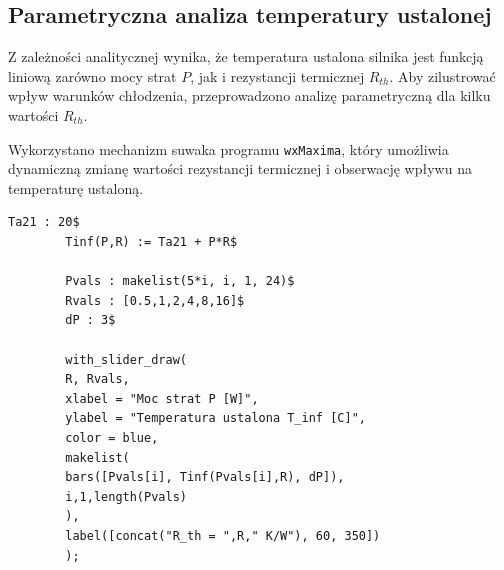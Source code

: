 \documentclass[a4paper,12pt]{article}
\begin{document}
	
	
	
	
	
	
	\subsection{Parametryczna analiza temperatury ustalonej}
	
	Z zależności analitycznej wynika, że temperatura ustalona silnika
	jest funkcją liniową zarówno mocy strat $P$, jak i rezystancji termicznej $R_{th}$.
	Aby zilustrować wpływ warunków chłodzenia, przeprowadzono analizę
	parametryczną dla kilku wartości $R_{th}$.
	
	Wykorzystano mechanizm suwaka programu \texttt{wxMaxima}, który umożliwia
	dynamiczną zmianę wartości rezystancji termicznej i obserwację wpływu
	na temperaturę ustaloną.
	
	\begin{lstlisting}[caption={Temperatura ustalona w funkcji P i Rth}]
		Ta21 : 20$
		Tinf(P,R) := Ta21 + P*R$
		
		Pvals : makelist(5*i, i, 1, 24)$
		Rvals : [0.5,1,2,4,8,16]$
		dP : 3$
		
		with_slider_draw(
		R, Rvals,
		xlabel = "Moc strat P [W]",
		ylabel = "Temperatura ustalona T_inf [C]",
		color = blue,
		makelist(
		bars([Pvals[i], Tinf(Pvals[i],R), dP]),
		i,1,length(Pvals)
		),
		label([concat("R_th = ",R," K/W"), 60, 350])
		);
	\end{lstlisting}
	
	
	
\end{document}
